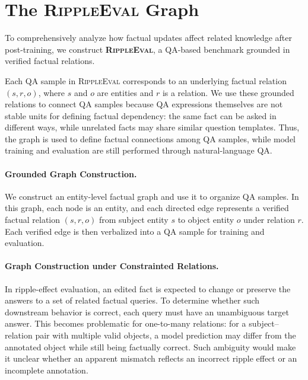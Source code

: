

\section{The \textsc{RippleEval} Graph}
\label{sec:dataset}

To comprehensively analyze how factual updates affect related knowledge after post-training, we construct \textbf{\textsc{RippleEval}}, a QA-based benchmark grounded in verified factual relations. 

Each QA sample in \textsc{RippleEval} corresponds to an underlying factual relation $(s,r,o)$, where $s$ and $o$ are entities and $r$ is a relation. We use these grounded relations to connect QA samples because QA expressions themselves are not stable units for defining factual dependency: the same fact can be asked in different ways, while unrelated facts may share similar question templates. Thus, the graph is used to define factual connections among QA samples, while model training and evaluation are still performed through natural-language QA.

\paragraph{Grounded Graph Construction.}
We construct an entity-level factual graph and use it to organize QA samples. In this graph, each node is an entity, and each directed edge represents a verified factual relation $(s,r,o)$ from subject entity $s$ to object entity $o$ under relation $r$. Each verified edge is then verbalized into a QA sample for training and evaluation.

\paragraph{Graph Construction under Constrainted Relations.}
In ripple-effect evaluation, an edited fact is expected to change or preserve the answers to a set of related factual queries. To determine whether such downstream behavior is correct, each query must have an unambiguous target answer. This becomes problematic for one-to-many relations: for a subject--relation pair with multiple valid objects, a model prediction may differ from the annotated object while still being factually correct. Such ambiguity would make it unclear whether an apparent mismatch reflects an incorrect ripple effect or an incomplete annotation.

